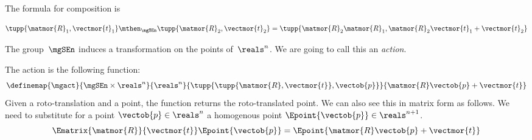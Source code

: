 The formula for composition is

\begin{equation}\label{eq:SE-composition-short}
  \tupp{\matmor{R}_1, \vectmor{t}_1} \mthen_{\mgSEn} \tupp{\matmor{R}_2, \vectmor{t}_2}  = \tupp{\matmor{R}_2 \matmor{R}_1, \matmor{R}_2 \vectmor{t}_1 + \vectmor{t}_2}
\end{equation}

%

The group~$\mgSEn$ induces a transformation on the points of~$\reals^n$.
We are going to call this an \emph{action}.

The action is the following function:
%
\begin{equation}\label{eq:apply}
\definemap{\mgact}{\mgSEn \times \reals^n}{\reals^n}{\tupp{ \tupp{\matmor{R}, \vectmor{t}}, \vectob{p}}}{\matmor{R}\vectob{p} + \vectmor{t}}
\end{equation}
Given a roto-translation and a point, the function returns the roto-translated point.
%
We can also see this in matrix form as follows. We need to substitute for a point $\vectob{p} \in \reals^n$ a homogenous point
$ \Epoint{\vectob{p}} \in \reals^{n+1}$.
%
\begin{equation}\label{eq:homogenous}
\Ematrix{\matmor{R}}{\vectmor{t}}
\Epoint{\vectob{p}}
 =
 \Epoint{\matmor{R}\vectob{p} + \vectmor{t}}
\end{equation}



